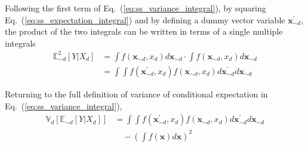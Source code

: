 Following the first term of Eq.~(\ref{eq:ss_variance_integral}), by squaring Eq.~(\ref{eq:ss_expectation_integral})
and by defining a dummy vector variable $\mathbf{x}^{\prime}_{\sim d}$, 
the product of the two integrals can be written in terms of a single multiple integrals
\begin{equation}
  \begin{split}
    \mathbb{E}_{\sim d}^{2} [Y|X_d] & = \int f(\mathbf{x}_{\sim d}, x_d) d\mathbf{x}_{\sim d} \cdot \int f(\mathbf{x}_{\sim d}, x_d) d\mathbf{x}_{\sim d} \\
                                    & = \int \int f(\mathbf{x}^{\prime}_{\sim d}, x_d) f(\mathbf{x}_{\sim d}, x_d) d\mathbf{x}^{\prime}_{\sim d} d\mathbf{x}_{\sim d}
  \end{split}
\label{eq:ss_multiple_integrals}
\end{equation}

Returning to the full definition of variance of conditional expectation in Eq.~(\ref{eq:ss_variance_integral}),
\begin{equation}
  \begin{split}
    \mathbb{V}_{d}[\mathbb{E}_{\sim d}[Y|X_d]] & = \int \int f(\mathbf{x}^{\prime}_{\sim d}, x_d) f(\mathbf{x}_{\sim d}, x_d) d\mathbf{x}^{\prime}_{\sim d} d\mathbf{x}_{\sim d} \\
                                               & \quad - \left(\int f(\mathbf{x}) d\mathbf{x}\right)^2
  \end{split}
\label{eq:ss_variance_integral_single}
\end{equation}

